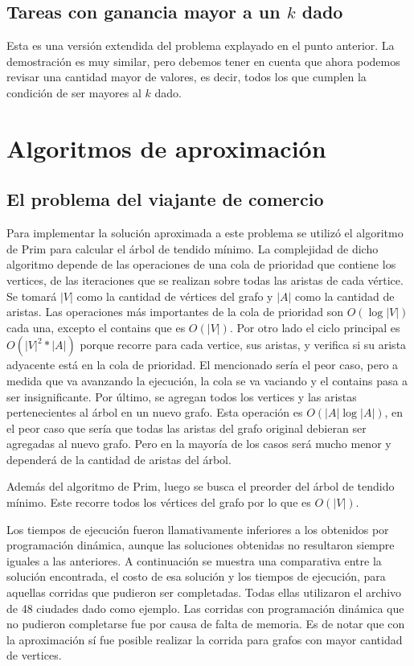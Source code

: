 \documentclass[a4paper,10pt]{article}
\begin{document}
\subsection{Tareas con ganancia mayor a un \(k\) dado}

Esta es una versión extendida del problema explayado en el punto anterior. La demostración es muy similar, pero debemos tener en cuenta que ahora podemos revisar una cantidad mayor de valores, es decir, todos los que cumplen la condición de ser mayores al \(k\) dado.

\section{Algoritmos de aproximación}

\subsection{El problema del viajante de comercio}

Para implementar la solución aproximada a este problema se utilizó el algoritmo de Prim para calcular el árbol de tendido mínimo. La complejidad de dicho algoritmo depende de las operaciones de una cola de prioridad que contiene los vertices, de las iteraciones que se realizan sobre todas las aristas de cada vértice. Se tomará $|V|$ como la cantidad de vértices del grafo y $|A|$ como la cantidad de aristas. 
Las operaciones más importantes de la cola de prioridad son $O(\log{|V|})$ cada una, excepto el contains que es $O(|V|)$.
Por otro lado el ciclo principal es $O(|V|^2 *|A|)$ porque recorre para cada vertice, sus aristas, y verifica si su arista adyacente está en la cola de prioridad. El mencionado sería el peor caso, pero a medida que va avanzando la ejecución, la cola se va vaciando y el contains pasa a ser insignificante. Por último, se agregan todos los vertices y las aristas pertenecientes al árbol en un nuevo grafo. Esta operación es $O(|A| \log{|A|})$, en el peor caso que sería que todas las aristas del grafo original debieran ser agregadas al nuevo grafo. Pero en la mayoría de los casos será mucho menor y dependerá de la cantidad de aristas del árbol.

Además del algoritmo de Prim, luego se busca el preorder del árbol de tendido mínimo. Este recorre todos los vértices del grafo por lo que es $O(|V|)$.

Los tiempos de ejecución fueron llamativamente inferiores a los obtenidos por programación dinámica, aunque las soluciones obtenidas no resultaron siempre iguales a las anteriores. A continuación se muestra una comparativa entre la solución encontrada, el costo de esa solución y los tiempos de ejecución, para aquellas corridas que pudieron ser completadas. Todas ellas utilizaron el archivo de 48 ciudades dado como ejemplo. Las corridas con programación dinámica que no pudieron completarse fue por causa de falta de memoria. Es de notar que con la aproximación sí fue posible realizar la corrida para grafos con mayor cantidad de vertices.
\end{document}
